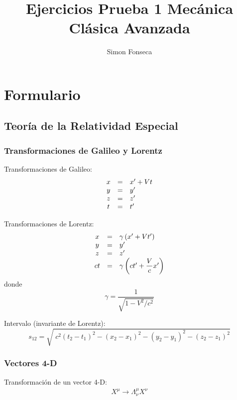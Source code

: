 \documentclass[]{report}
\title{Ejercicios Prueba 1 Mecánica Clásica Avanzada}
\author{Simon Fonseca}
\numberwithin{equation}{section}
\newcommand{\0}{\textcolor{gray}{0}}
\begin{document}
\maketitle

\chapter{Formulario}

\section{Teoría de la Relatividad Especial}

\subsection{Transformaciones de Galileo y Lorentz}
\phantom{.}

Transformaciones de Galileo:
\begin{equation}
	\begin{matrix}
		x &=& x' + Vt\\
		y &=& y' \hfill\\
		z &=& z' \hfill\\
		t &=& t' \hfill
	\end{matrix}
\end{equation}

Transformaciones de Lorentz:
\begin{equation}
	\begin{matrix}
		x &=& \gamma\left({x' + Vt'}\right) \hfill\\
		y &=& y' \hfill\\
		z &=& z' \hfill\\
		ct &=& \gamma \left(ct' + \dfrac{V}{c} x'\right) \hfill
	\end{matrix}
\end{equation}
donde
\begin{equation}
	\gamma = \frac{1}{\sqrt{1 - V^2/c^2}}
\end{equation}

Intervalo (invariante de Lorentz):
\begin{equation}
	s_{12} = \sqrt{\phantom{\dfrac{\frac{}{}}{}} c^2(t_2-t_1)^2 - (x_2-x_1)^2 - (y_2-y_1)^2 - (z_2-z_1)^2}
	\label{eqn:intervalo_def}
\end{equation}

\subsection{Vectores 4-D}
Transformación de un vector 4-D:
\begin{align}
	X^\mu\rightarrow\Lambda^\mu_\nu X^\nu
\end{align}
\end{document}
